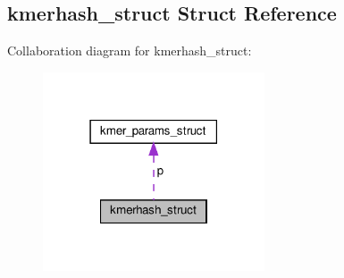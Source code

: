 \hypertarget{structkmerhash__struct}{}\subsection{kmerhash\+\_\+struct Struct Reference}
\label{structkmerhash__struct}


Collaboration diagram for kmerhash\+\_\+struct\+:\nopagebreak
\begin{figure}[H]
\begin{center}
\leavevmode
\includegraphics[width=186pt]{structkmerhash__struct__coll__graph}
\end{center}
\end{figure}
